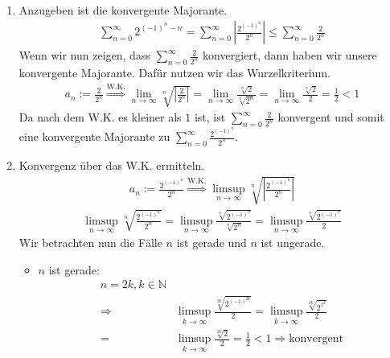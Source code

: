 \begin{lsg}\mbox{ }
\begin{enumerate}[label=$\mathrm{(\roman*)}$, ref=$\mathrm{\roman*}$]
\item Anzugeben ist die konvergente Majorante.
\begin{align*}
\sum^{\infty}_{n=0} 2^{(-1)^n - n} = \sum^{\infty}_{n=0} \left|\frac{2^{(-1)^n}}{2^n}\right| \leq \sum^{\infty}_{n=0} \frac{2}{2^n}
\end{align*}
Wenn wir nun zeigen, dass $\sum^{\infty}_{n=0} \frac{2}{2^n}$ konvergiert, dann haben wir unsere konvergente Majorante. Dafür nutzen wir das Wurzelkriterium.
\begin{align*}
a_n:=\frac{2}{2^n} \overset{\text{W.K.}}{\Longrightarrow} \lim_{n \to \infty}\sqrt[n]{\left|\frac{2}{2^n}\right|} = \lim_{n \to \infty}\frac{\sqrt[n]{2}}{\sqrt[n]{2^n}} = \lim_{n \to \infty}\frac{\sqrt[n]{2}}{2} = \frac{1}{2} < 1
\end{align*}
Da nach dem W.K. es kleiner als $1$ ist, ist $\sum^{\infty}_{n=0} \frac{2}{2^n}$ konvergent und somit eine konvergente Majorante zu $\sum^{\infty}_{n=0} \frac{2^{(-1)^n}}{2^n}$.
\item Konvergenz über das W.K. ermitteln.
\begin{align*}
a_n:= \frac{2^{(-1)^n}}{2^n} \overset{\text{W.K.}}{\Longrightarrow} \limsup_{n \to \infty}\sqrt[n]{\left|\frac{2^{(-1)^n}}{2^n}\right|}
\end{align*}
\begin{align*}
\limsup_{n \to \infty}\sqrt[n]{\frac{2^{(-1)^n}}{2^n}} = \limsup_{n \to \infty}\frac{\sqrt[n]{2^{(-1)^n}}}{\sqrt[n]{2^n}} = \limsup_{n \to \infty}\frac{\sqrt[n]{2^{(-1)^n}}}{2}
\end{align*}
Wir betrachten nun die Fälle $n$ ist gerade und $n$ ist ungerade.
\begin{itemize}
\item $n$ ist gerade:
\begin{align*}
n = 2k ,k\in \mathbb{N} \\
\Rightarrow &\limsup_{k \to \infty}\frac{\sqrt[2k]{2^{(-1)^{2k}}}}{2} = \limsup_{k \to \infty}\frac{\sqrt[2k]{2^{1^k}}}{2} \\
= &\limsup_{k \to \infty}\frac{\sqrt[2k]{2}}{2} = \frac{1}{2} < 1 \Rightarrow \text{konvergent}
\end{align*}


\end{itemize}
\end{enumerate}
\end{lsg}
